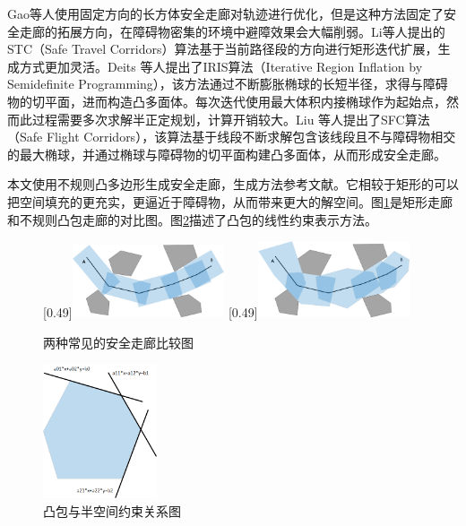 \documentclass[master,academic]{ysuthesis} %
\begin{document}
	Gao等人使用固定方向的长方体安全走廊对轨迹进行优化，但是这种方法固定了安全走廊的拓展方向，在障碍物密集的环境中避障效果会大幅削弱。Li等人提出的STC（Safe Travel Corridors）算法基于当前路径段的方向进行矩形迭代扩展，生成方式更加灵活。Deits 等人提出了IRIS算法（Iterative Region Inflation by Semidefinite Programming），该方法通过不断膨胀椭球的长短半径，求得与障碍物的切平面，进而构造凸多面体。每次迭代使用最大体积内接椭球作为起始点，然而此过程需要多次求解半正定规划，计算开销较大。Liu 等人提出了SFC算法（Safe Flight Corridors），该算法基于线段不断求解包含该线段且不与障碍物相交的最大椭球，并通过椭球与障碍物的切平面构建凸多面体，从而形成安全走廊。
	
	本文使用不规则凸多边形生成安全走廊，生成方法参考文献\cite{SikangLiu:2017}。它相较于矩形的可以把空间填充的更充实，更逼近于障碍物，从而带来更大的解空间。图\ref{安全走廊比较}是矩形走廊和不规则凸包走廊的对比图。图\ref{fig:凸包矩阵}描述了凸包的线性约束表示方法。
	\begin{figure}[H]
		\centering
		[0.49\textwidth]{\includegraphics[width=0.4\textwidth]{安全走廊比较矩形1.png}}
		[0.49\textwidth]{\includegraphics[width=0.4\textwidth]{安全走廊比较多边形2.png}}
		\caption{两种常见的安全走廊比较图}
		\label{安全走廊比较}
	\end{figure}

	\begin{figure}[H]
		\centering
		\includegraphics[width=0.3\textwidth]{凸包矩阵.png}
		\caption{凸包与半空间约束关系图}
		\label{fig:凸包矩阵}
	\end{figure}
\end{document}

